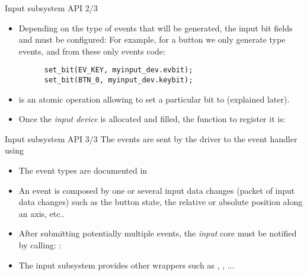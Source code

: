 \begin{frame}[fragile]{Input subsystem API 2/3}
  \begin{itemize}
  \item Depending on the type of events that will be generated, the
    input bit fields  and  must be configured:
    For example, for a button we only generate
     type events, and from these only  events
    code:
    \begin{block}{}
    \begin{verbatim}
      set_bit(EV_KEY, myinput_dev.evbit);
      set_bit(BTN_0, myinput_dev.keybit);
    \end{verbatim}
    \end{block}
  \item {} is an atomic operation allowing to set a particular bit
        to  (explained later).
  \item Once the {\em input device} is allocated and filled, the
    function to register it
    is: 
  \end{itemize}
\end{frame}

\begin{frame}{Input subsystem API 3/3}
    The events are sent by the driver to the event handler using
    \begin{itemize}
    \item The event types are documented in 
    \item An event is composed by one or several input data changes
      (packet of input data changes) such as the button state, the
      relative or absolute position along an axis, etc..
    \item After submitting potentially multiple events, the {\em
        input} core must be notified by calling:
      :
    \item The input subsystem provides other wrappers such as
      , , ...
    \end{itemize}
\end{frame}


